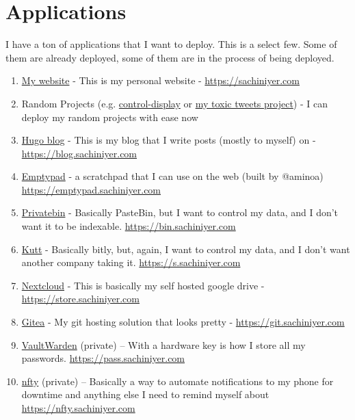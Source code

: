 \documentclass[12pt]{article}
\begin{document}
\section{Applications}
I have a ton of applications that I want to deploy. This is a select few. Some of them are already deployed, some of them are in the process of being deployed.
\begin{enumerate}
  \item \href{https://sachiniyer.com}{My website} - This is my personal website - \href{https://sachiniyer.com}{https://sachiniyer.com}
  \item Random Projects (e.g. \href{https://school-demo.sachiniyer.com}{control-display} or \href{https://ai.sachiniyer.com}{my toxic tweets project}) - I can deploy my random projects with ease now
  \item \href{https://gohugo.io/}{Hugo blog} - This is my blog that I write posts (mostly to myself) on - \href{https://blog.sachiniyer.com}{https://blog.sachiniyer.com}
  \item \href{https://github.com/aminoa/emptypad}{Emptypad} - a scratchpad that I can use on the web (built by @aminoa) \href{https://emptypad.sachiniyer.com}{https://emptypad.sachiniyer.com}
  \item \href{https://privatebin.info/}{Privatebin} - Basically PasteBin, but I want to control my data, and I don't want it to be indexable. \href{https://bin.sachiniyer.com}{https://bin.sachiniyer.com}
  \item \href{https://kutt.it/}{Kutt} - Basically bitly, but, again, I want to control my data, and I don't want another company taking it. \href{https://s.sachiniyer.com}{https://s.sachiniyer.com}
  \item \href{https://nextcloud.com}{Nextcloud} - This is basically my self hosted google drive - \href{https://store.sachiniyer.com}{https://store.sachiniyer.com}
  \item \href{https://gitea.io}{Gitea} - My git hosting solution that looks pretty - \href{https://git.sachiniyer.com}{https://git.sachiniyer.com}
  \item \href{https://github.com/dani-garcia/vaultwarden}{VaultWarden} (private) -- With a hardware key is how I store all my passwords. \href{https://pass.sachiniyer.com}{https://pass.sachiniyer.com}
  \item \href{https://docs.ntfy.sh/}{nfty} (private) -- Basically a way to automate notifications to my phone for downtime and anything else I need to remind myself about \href{https://nfty.sachiniyer.com}{https://nfty.sachiniyer.com}

\end{enumerate}
\end{document}
